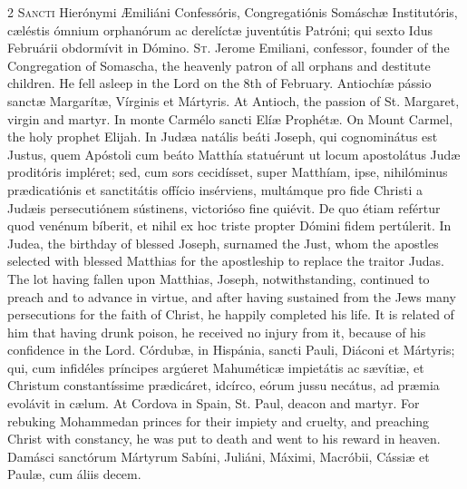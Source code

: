 \begin{paracol}{2}
\lettrine[lines=2]{S}{ancti} Hierónymi 
 Æmiliáni Confessóris, Congregatiónis Somáschæ Institutóris, cæléstis ómnium 
 orphanórum ac derelíctæ juventútis Patróni; qui sexto Idus Februárii 
 obdormívit in Dómino.
\switchcolumn
{}
\lettrine[lines=2]{S}{t.} Jerome Emiliani, confessor, 
 founder of the Congregation of Somascha, the heavenly patron of all orphans 
 and destitute children. He fell asleep in the Lord on the 8th of 
 February.
\switchcolumn*
{}
Antiochíæ pássio sanctæ 
 Margarítæ, Vírginis et Mártyris.
\switchcolumn
{}
At Antioch, the passion of St. 
 Margaret, virgin and martyr.
\switchcolumn*
{}
In monte Carmélo sancti 
 Elíæ Prophétæ.
\switchcolumn
{}
On Mount Carmel, the holy prophet 
 Elijah.
\switchcolumn*
{}
In Judæa natális beáti 
 Joseph, qui cognominátus est Justus, quem Apóstoli cum beáto Matthía 
 statuérunt ut locum apostolátus Judæ proditóris impléret; sed, cum sors 
 cecidísset, super Matthíam, ipse, nihilóminus prædicatiónis et sanctitátis 
 offício insérviens, multámque pro fide Christi a Judæis persecutiónem 
 sústinens, victorióso fine quiévit. De quo étiam refértur quod venénum 
 bíberit, et nihil ex hoc triste propter Dómini fidem pertúlerit.
\switchcolumn
{}
In Judea, the birthday of blessed 
 Joseph, surnamed the Just, whom the apostles selected with blessed Matthias 
 for the apostleship to replace the traitor Judas. The lot having 
 fallen upon Matthias, Joseph, notwithstanding, continued to preach and to 
 advance in virtue, and after having sustained from the Jews many 
 persecutions for the faith of Christ, he happily completed his life. 
 It is related of him that having drunk poison, he received no injury from 
 it, because of his confidence in the Lord.
\switchcolumn*
{}
Córdubæ, in Hispánia, 
 sancti Pauli, Diáconi et Mártyris; qui, cum infidéles príncipes argúeret 
 Mahuméticæ impietátis ac sævítiæ, et Christum constantíssime prædicáret, 
 idcírco, eórum jussu necátus, ad præmia evolávit in cælum.
\switchcolumn
{}
At Cordova in Spain, St. Paul, 
 deacon and martyr. For rebuking Mohammedan princes for their impiety 
 and cruelty, and preaching Christ with constancy, he was put to death and 
 went to his reward in heaven.
\switchcolumn*
{}
Damásci sanctórum 
 Mártyrum Sabíni, Juliáni, Máximi, Macróbii, Cássiæ et Paulæ, cum áliis decem.

\end{paracol}
